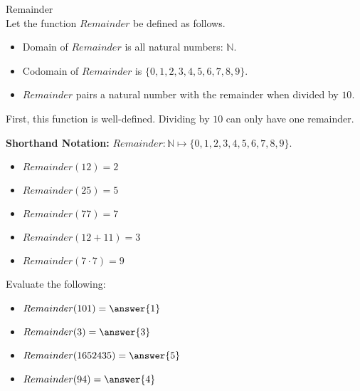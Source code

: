 \documentclass{ximera}
\begin{document}
\begin{example} Remainder \\

Let the function $Remainder$ be defined as follows.


\begin{itemize}
\item Domain of $Remainder$ is all natural numbers: $\mathbb{N}$.
\item Codomain of $Remainder$ is $\{ 0, 1, 2, 3, 4, 5, 6, 7, 8, 9 \}$.
\item $Remainder$ pairs a natural number with the remainder when divided by $10$.
\end{itemize}


First, this function is well-defined. Dividing by $10$ can only have one remainder.


\textbf{Shorthand Notation: } $Remainder: \mathbb{N} \mapsto \{ 0, 1, 2, 3, 4, 5, 6, 7, 8, 9 \}$.





\begin{itemize}
	\item $Remainder(12) = 2$
	\item $Remainder(25) = 5$
	\item $Remainder(77) = 7$
	\item $Remainder(12 + 11) = 3$
	\item $Remainder(7 \cdot 7) = 9$
\end{itemize}









\begin{question}
Evaluate the following:

\begin{itemize}
	\item $Remainder(101) = \answer{1}$
	\item $Remainder(3) = \answer{3}$
	\item $Remainder(1652435) = \answer{5}$
	\item $Remainder(94) = \answer{4}$
\end{itemize}

\end{question}



\end{example}
\end{document}
